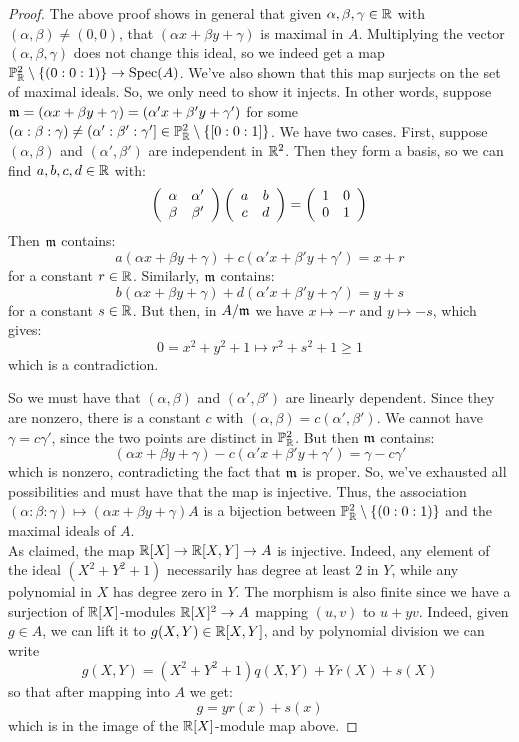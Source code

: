 \begin{proof}
	The above proof shows in general that given $\alpha,\beta,\gamma \in \mathbb{R}$ with $(\alpha,\beta) \neq (0,0)$, that $(\alpha x + \beta y + \gamma)$ is maximal in $A$. Multiplying the vector $(\alpha,\beta,\gamma)$ does not change this ideal, so we indeed get a map $\mathbb{P}_{\mathbb{R}}^2 \setminus \{(0:0:1)\} \to \operatorname{Spec}(A)$. We've also shown that this map surjects on the set of maximal ideals. So, we only need to show it injects. In other words, suppose $\mathfrak{m} = (\alpha x + \beta y + \gamma) = (\alpha'x+\beta'y+\gamma')$ for some $(\alpha:\beta:\gamma) \neq (\alpha':\beta':\gamma'] \in \mathbb{P}_{\mathbb{R}}^2 \setminus \{[0:0:1]\}$. We have two cases. First, suppose $(\alpha,\beta)$ and $(\alpha',\beta')$ are independent in $\mathbb{R}^2$. Then they form a basis, so we can find $a,b,c,d \in \mathbb{R}$ with:
	\[ \left(\begin{array}{cc} \alpha & \alpha' \\ \beta & \beta' \end{array}\right)\left(\begin{array}{cc} a & b \\ c & d \end{array}\right) = \left(\begin{array}{cc} 1 & 0 \\ 0 & 1 \end{array}\right) \]
	Then $\mathfrak{m}$ contains:
	\[ a(\alpha x + \beta y + \gamma) + c(\alpha'x+\beta'y+\gamma') = x + r \]
	for a constant $r \in \mathbb{R}$. Similarly, $\mathfrak{m}$ contains:
	\[ b(\alpha x + \beta y + \gamma) + d(\alpha'x+\beta'y+\gamma') = y + s \]
	for a constant $s \in \mathbb{R}$. But then, in $A/\mathfrak{m}$ we have $x \mapsto -r$ and $y \mapsto -s$, which gives:
	\[ 0 = x^2+y^2+1 \mapsto r^2+s^2+1 \geq 1 \]
	which is a contradiction.
	
	So we must have that $(\alpha,\beta)$ and $(\alpha',\beta')$ are linearly dependent. Since they are nonzero, there is a constant $c$ with $(\alpha,\beta) = c(\alpha',\beta')$. We cannot have $\gamma = c\gamma'$, since the two points are distinct in $\mathbb{P}_{\mathbb{R}}^2$. But then $\mathfrak{m}$ contains:
	\[ (\alpha x + \beta y + \gamma) - c(\alpha'x + \beta'y + \gamma') = \gamma-c\gamma' \]
	which is nonzero, contradicting the fact that $\mathfrak{m}$ is proper. So, we've exhausted all possibilities and must have that the map is injective. Thus, the association $(\alpha:\beta:\gamma) \mapsto (\alpha x + \beta y + \gamma)A$ is a bijection between $\mathbb{P}_{\mathbb{R}}^2 \setminus \{(0:0:1)\}$ and the maximal ideals of $A$. \\
	
	As claimed, the map $\mathbb{R}[X] \to \mathbb{R}[X,Y] \to A$ is injective. Indeed, any element of the ideal $(X^2+Y^2+1)$ necessarily has degree at least $2$ in $Y$, while any polynomial in $X$ has degree zero in $Y$. The morphism is also finite since we have a surjection of $\mathbb{R}[X]$-modules $\mathbb{R}[X]^2 \to A$ mapping $(u,v)$ to $u+yv$. Indeed, given $g \in A$, we can lift it to $g(X,Y) \in \mathbb{R}[X,Y]$, and by polynomial division we can write
	\[ g(X,Y) = (X^2+Y^2+1)q(X,Y) + Yr(X) + s(X) \]
	so that after mapping into $A$ we get:
	\[ g = yr(x) + s(x) \]
	which is in the image of the $\mathbb{R}[X]$-module map above.
	

\end{proof}
